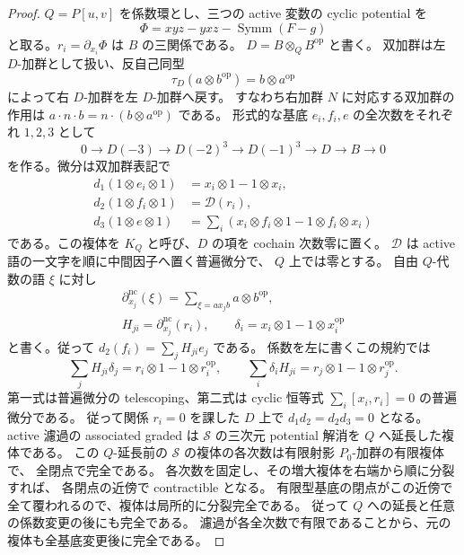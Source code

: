 \begin{proof}
$Q=P[u,v]$ を係数環とし、三つの active 変数の cyclic potential を
\[
 \Phi=xyz-yxz-\operatorname{Symm}(F-g)
\]
と取る。$r_i=\partial_{x_i}\Phi$ は $B$ の三関係である。
$D=B\otimes_QB^{\mathrm{op}}$ と書く。
双加群は左 $D$-加群として扱い、反自己同型
\[
 \tau_D(a\otimes b^{\mathrm{op}})=b\otimes a^{\mathrm{op}}
\]
によって右 $D$-加群を左 $D$-加群へ戻す。
すなわち右加群 $N$ に対応する双加群の作用は
$a\cdot n\cdot b=n\cdot(b\otimes a^{\mathrm{op}})$ である。
形式的な基底 $e_i,f_i,e$ の全次数をそれぞれ $1,2,3$ として
\[
 0\longrightarrow D(-3)\longrightarrow D(-2)^3
   \longrightarrow D(-1)^3\longrightarrow D\longrightarrow B\longrightarrow0
\]
を作る。微分は双加群表記で
\begin{align*}
 d_1(1\otimes e_i\otimes1)&=x_i\otimes1-1\otimes x_i,\\
 d_2(1\otimes f_i\otimes1)&=\mathcal D(r_i),\\
 d_3(1\otimes e\otimes1)&=
       \sum_i(x_i\otimes f_i\otimes1-1\otimes f_i\otimes x_i)
\end{align*}
である。この複体を $K_Q$ と呼び、$D$ の項を cochain 次数零に置く。
$\mathcal D$ は active 語の一文字を順に中間因子へ置く普遍微分で、
$Q$ 上では零とする。
自由 $Q$-代数の語 $\xi$ に対し
\begin{gather*}
 \partial^{\mathrm{nc}}_{x_j}(\xi)
   =\sum_{\xi=a x_j b}a\otimes b^{\mathrm{op}},\\
 H_{ji}=\partial^{\mathrm{nc}}_{x_j}(r_i),\qquad
 \delta_i=x_i\otimes1-1\otimes x_i^{\mathrm{op}}
\end{gather*}
と書く。従って $d_2(f_i)=\sum_jH_{ji}e_j$ である。
係数を左に書くこの規約では
\[
 \sum_jH_{ji}\delta_j=r_i\otimes1-1\otimes r_i^{\mathrm{op}},\qquad
 \sum_i\delta_iH_{ji}=r_j\otimes1-1\otimes r_j^{\mathrm{op}}.
\]
第一式は普遍微分の telescoping、第二式は
cyclic 恒等式 $\sum_i[x_i,r_i]=0$ の普遍微分である。
従って関係 $r_i=0$ を課した $D$ 上で $d_1d_2=d_2d_3=0$ となる。
active 濾過の associated graded は $\mathscr S$ の三次元 potential 解消を
$Q$ へ延長した複体である。
この $Q$-延長前の $\mathscr S$ の複体の各次数は有限射影 $P_0$-加群の有限複体で、
全閉点で完全である。
各次数を固定し、その増大複体を右端から順に分裂すれば、
各閉点の近傍で contractible となる。
有限型基底の閉点がこの近傍で全て覆われるので、複体は局所的に分裂完全である。
従って $Q$ への延長と任意の係数変更の後にも完全である。
濾過が各全次数で有限であることから、元の複体も全基底変更後に完全である。


\end{proof}
